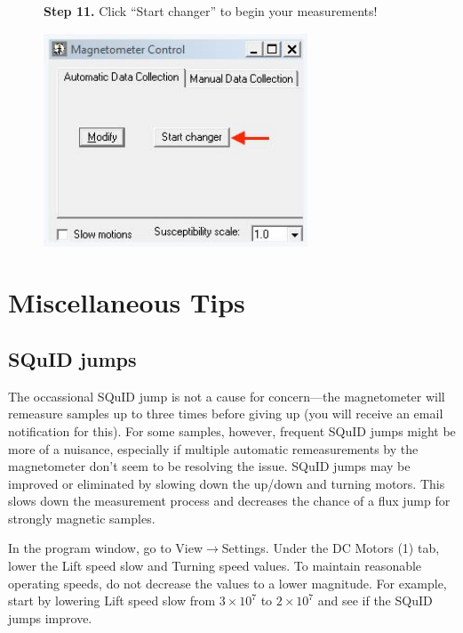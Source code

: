 \documentclass[11pt,letterpaper]{article}
\begin{document}
\begin{figure}
\begin{flushleft}
\textbf{Step 11.}
Click ``Start changer'' to begin your measurements!
\end{flushleft}
\centering
\includegraphics[width=0.7\textwidth]{images/Capture13.jpg}
\end{figure}

\clearpage

\section*{Miscellaneous Tips}
\subsection*{SQuID jumps}
The occassional SQuID jump is not a cause for concern---the magnetometer will remeasure samples up to three times before giving up (you will receive an email notification for this). For some samples, however, frequent SQuID jumps might be more of a nuisance, especially if multiple automatic remeasurements by the magnetometer don't seem to be resolving the issue. SQuID jumps may be improved or eliminated by slowing down the up/down and turning motors. This slows down the measurement process and decreases the chance of a flux jump for strongly magnetic samples.

In the program window, go to \textsf{View}$\rightarrow$\textsf{Settings}. Under the \textsf{DC Motors (1)} tab, lower the \textsf{Lift speed slow} and \textsf{Turning speed} values. To maintain reasonable operating speeds, do not decrease the values to a lower magnitude. For example, start by lowering \textsf{Lift speed slow} from $3\times10^7$ to $2\times10^7$ and see if the SQuID jumps improve.
\end{document}
